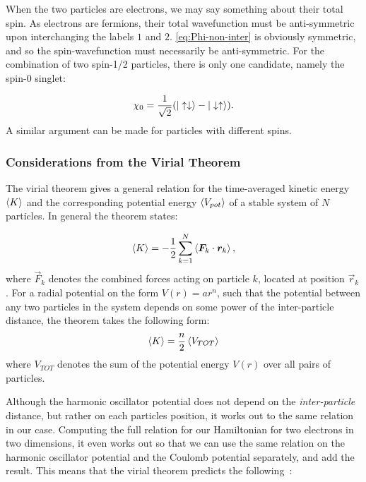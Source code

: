 \documentclass[Thesis.tex]{subfiles}
\begin{document}
When the two particles are electrons, we may say something about their total
spin. As electrons are fermions, their total wavefunction must be
anti-symmetric upon interchanging the labels $1$ and $2$.
\cref{eq:Phi-non-inter} is obviously symmetric, and so the
spin-wavefunction must necessarily be anti-symmetric. For the combination of
two spin-1/2 particles, there is only one candidate, namely the spin-$0$
singlet:

\begin{align}
    \chi_0 = \frac{1}{\sqrt 2}\qty(| \uparrow\downarrow \rangle -
    | \downarrow\uparrow \rangle).
\end{align}
A similar argument can be made for particles with different spins.

\subsubsection{Considerations from the Virial Theorem}

The virial theorem gives a general relation for the time-averaged kinetic
energy $\expval{K}$ and the corresponding potential energy
$\expval{V_{pot}}$ of a stable system of $N$ particles. In general the
theorem states:

\begin{align}
    \expval{K} = -\frac{1}{2}\sum_{k=1}^N \expval{\bm{F}_k \cdot \bm{r}_k},\label{eq:virial-theorem}
\end{align}
where $\vec F_k$ denotes the combined forces acting on particle $k$, located
at position $\vec r_k$. For a radial potential on the form $V(r)=ar^n$, such
that the potential between any two particles in the system depends on some
power of the inter-particle distance, the
theorem takes the following form:
\begin{align}
    \expval{K} = \frac{n}{2}\expval{V_{TOT}}
\end{align}
where $V_{TOT}$ denotes the sum of the potential energy $V(r)$ over all
pairs of particles.

Although the harmonic oscillator potential does not depend on the
\emph{inter-particle} distance, but rather on each particles position, it
works out to the same relation in our case. Computing the full relation for
our Hamiltonian for two electrons in two dimensions, it even works out so
that we can use the same relation on the harmonic oscillator potential and the Coulomb
potential separately, and add the result. This means that the virial theorem
predicts the following~\cite{Katriel2012}:
\end{document}
